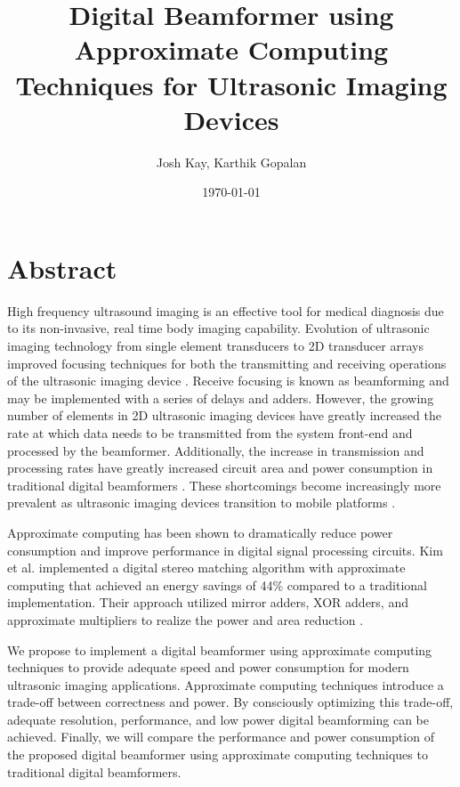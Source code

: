 \documentclass{article}
\title{Digital Beamformer using Approximate Computing Techniques for Ultrasonic Imaging Devices }
\author{Josh Kay, Karthik Gopalan}
\date{\today}
\begin{document}
\maketitle

\section{Abstract}

High frequency ultrasound imaging is an effective tool for medical diagnosis due to its non-invasive, real time body imaging capability. Evolution of ultrasonic imaging technology from single element transducers to 2D transducer arrays improved focusing techniques for both the transmitting and receiving operations of the ultrasonic imaging device \cite{2dCMUT}. Receive focusing is known as beamforming and may be implemented with a series of delays and adders. However, the growing number of elements in 2D ultrasonic imaging devices have greatly increased the rate at which data needs to be transmitted from the system front-end and processed by the beamformer. Additionally, the increase in transmission and processing rates have greatly increased circuit area and power consumption in traditional digital beamformers \cite{ultrasoundLinearArray}. These shortcomings become increasingly more prevalent as ultrasonic imaging devices transition to mobile platforms \cite{mobileUltrasound}. 

Approximate computing has been shown to dramatically reduce power consumption and improve performance in digital signal processing circuits. Kim et al. implemented a digital stereo matching algorithm with approximate computing that achieved an energy savings of 44\% compared to a traditional implementation. Their approach utilized mirror adders, XOR adders, and approximate multipliers to realize the power and area reduction \cite{ShanApprox}. 

We propose to implement a digital beamformer using approximate computing techniques to provide adequate speed and power consumption for modern ultrasonic imaging applications. Approximate computing techniques introduce a trade-off between correctness and power. By consciously optimizing this trade-off, adequate resolution, performance, and low power digital beamforming can be achieved. Finally, we will compare the performance and power consumption of the proposed digital beamformer using approximate computing techniques to traditional digital beamformers. 

\nocite{*}


{\small }
\end{document}
